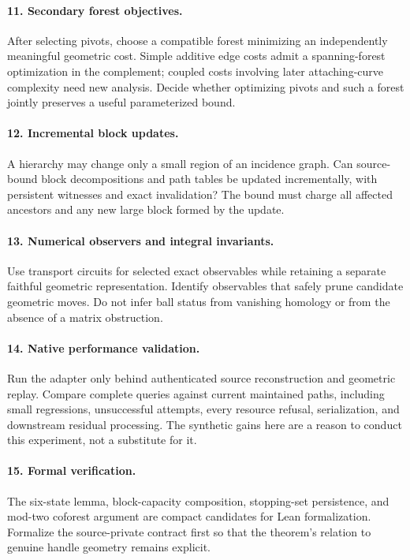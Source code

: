 \documentclass[11pt,letterpaper]{article}
\theoremstyle{definition}
\theoremstyle{remark}
\begin{document}
\paragraph{11. Secondary forest objectives.}
After selecting pivots, choose a compatible forest minimizing an independently meaningful geometric cost. Simple additive edge costs admit a spanning-forest optimization in the complement; coupled costs involving later attaching-curve complexity need new analysis. Decide whether optimizing pivots and such a forest jointly preserves a useful parameterized bound.

\paragraph{12. Incremental block updates.}
A hierarchy may change only a small region of an incidence graph. Can source-bound block decompositions and path tables be updated incrementally, with persistent witnesses and exact invalidation? The bound must charge all affected ancestors and any new large block formed by the update.

\paragraph{13. Numerical observers and integral invariants.}
Use transport circuits for selected exact observables while retaining a separate faithful geometric representation. Identify observables that safely prune candidate geometric moves. Do not infer ball status from vanishing homology or from the absence of a matrix obstruction.

\paragraph{14. Native performance validation.}
Run the adapter only behind authenticated source reconstruction and geometric replay. Compare complete queries against current maintained paths, including small regressions, unsuccessful attempts, every resource refusal, serialization, and downstream residual processing. The synthetic gains here are a reason to conduct this experiment, not a substitute for it.

\paragraph{15. Formal verification.}
The six-state lemma, block-capacity composition, stopping-set persistence, and mod-two coforest argument are compact candidates for Lean formalization. Formalize the source-private contract first so that the theorem's relation to genuine handle geometry remains explicit.
\end{document}
